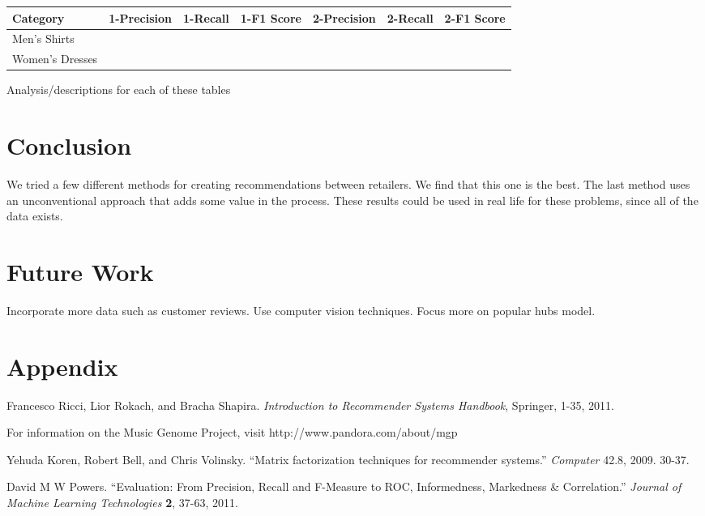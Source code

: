 \documentclass[11pt]{article}
\begin{document}
\begin{center}
\begin{tabular}{ | l | c | c | c | c | c | c |}
\hline
Category & 1-Precision & 1-Recall & 1-F1 Score & 2-Precision & 2-Recall & 2-F1 Score \\ \hline\hline
Men's Shirts &&&&&&\\ \hline
Women's Dresses &&&&&&\\ \hline
\end{tabular}
\end{center}

Analysis/descriptions for each of these tables

\section*{Conclusion}
We tried a few different methods for creating recommendations between
retailers. We find that this one is the best.
The last method uses an unconventional approach that adds some value in the
process. These results could be used in real life for these problems, since all
of the data exists.

\section*{Future Work}
Incorporate more data such as customer reviews. Use computer vision techniques.
Focus more on popular hubs model.

\section*{Appendix}

\begin{thebibliography}{9}

    Francesco Ricci, Lior Rokach, and Bracha Shapira.
    \emph{Introduction to Recommender Systems Handbook}, Springer, 1-35, 2011.

    For information on the Music Genome Project, visit
    http://www.pandora.com/about/mgp

    Yehuda Koren, Robert Bell, and Chris Volinsky.
    ``Matrix factorization techniques for recommender systems.''
    \emph{Computer} 42.8, 2009. 30-37.

    David M W Powers.
    ``Evaluation: From Precision, Recall and F-Measure to ROC, Informedness,
Markedness \& Correlation.''
    \emph{Journal of Machine Learning Technologies} \textbf{2}, 37-63, 2011.

\end{thebibliography}
\end{document}
